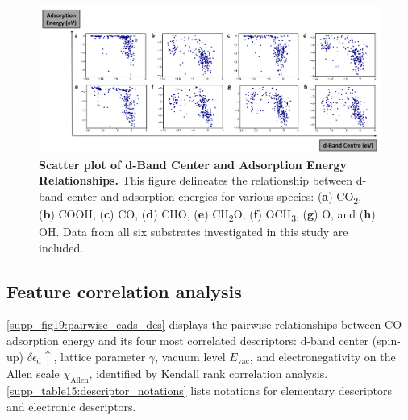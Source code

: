 \begin{figure}[htbp]
  \centering
  \includegraphics[width=\textwidth]{supp_fig18_d-band_eads.png}
  \caption{\textbf{Scatter plot of d-Band Center and Adsorption Energy Relationships.}
  This figure delineates the relationship between d-band center and adsorption energies for
  various species: (\textbf{a}) CO\textsubscript{2}, (\textbf{b}) COOH, (\textbf{c}) CO,
  (\textbf{d}) CHO, (\textbf{e}) CH\textsubscript{2}O, (\textbf{f}) OCH\textsubscript{3},
  (\textbf{g}) O, and (\textbf{h}) OH.
  Data from all six substrates investigated in this study are included.}
  \label{supp_fig18:dband_vs_eads}
\end{figure}

\subsection{Feature correlation analysis}
\label{supp_sec3.2_feature_corr}

\cref{supp_fig19:pairwise_eads_des} displays the pairwise relationships between CO adsorption energy
and its four most correlated descriptors: d-band center (spin-up) $\delta\epsilon_{\text{d}}\uparrow$,
lattice parameter $\gamma$, vacuum level $E_\text{vac}$, and electronegativity
on the Allen scale $\chi_\text{Allen}$, identified by Kendall rank correlation analysis.
\cref{supp_table15:descriptor_notations} lists notations for elementary descriptors and electronic descriptors.

